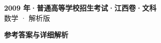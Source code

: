 \documentclass[zihao=-4, a4paper]{ctexart}
\begin{document}
\begin{center}
  {\Large\bfseries 2009 年·普通高等学校招生考试·江西卷·文科}\\[4pt]
  {\large 数学 · 解析版}
\end{center}
\medskip
{}

\clearpage
{}
\begin{center}{\Large\bfseries 参考答案与详细解析}\end{center}
\medskip

\end{document}
